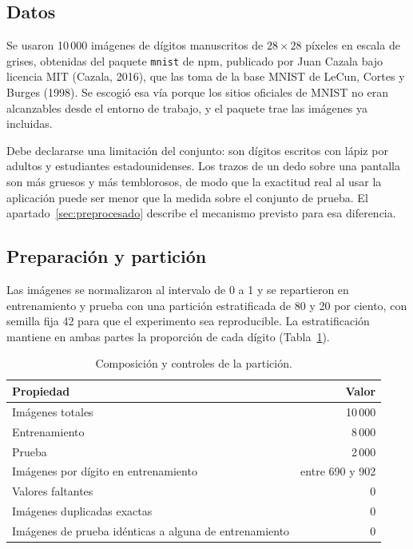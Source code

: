 \documentclass[12pt,letterpaper]{article}
\begin{document}
\subsection{Datos}
\label{sec:datos}

Se usaron 10\,000 imágenes de dígitos manuscritos de $28\times28$ píxeles en escala
de grises, obtenidas del paquete \texttt{mnist} de npm, publicado por Juan Cazala
bajo licencia MIT (Cazala, 2016), que las toma de la base MNIST de LeCun, Cortes y
Burges (1998). Se escogió esa vía porque los sitios oficiales de MNIST no eran
alcanzables desde el entorno de trabajo, y el paquete trae las imágenes ya
incluidas.

Debe declararse una limitación del conjunto: son dígitos escritos con lápiz por
adultos y estudiantes estadounidenses. Los trazos de un dedo sobre una pantalla son
más gruesos y más temblorosos, de modo que la exactitud real al usar la aplicación
puede ser menor que la medida sobre el conjunto de prueba. El
apartado~\ref{sec:preprocesado} describe el mecanismo previsto para esa diferencia.

\subsection{Preparación y partición}

Las imágenes se normalizaron al intervalo de 0 a 1 y se repartieron en entrenamiento
y prueba con una partición estratificada de 80 y 20 por ciento, con semilla fija 42
para que el experimento sea reproducible. La estratificación mantiene en ambas
partes la proporción de cada dígito (Tabla~\ref{tab:particion}).

\begin{table}[htbp]
\centering
\caption{Composición y controles de la partición.}
\label{tab:particion}
\begin{tabular}{lr}
\toprule
\textbf{Propiedad} & \textbf{Valor} \\
\midrule
Imágenes totales & 10\,000 \\
Entrenamiento & 8\,000 \\
Prueba & 2\,000 \\
Imágenes por dígito en entrenamiento & entre 690 y 902 \\
Valores faltantes & 0 \\
Imágenes duplicadas exactas & 0 \\
Imágenes de prueba idénticas a alguna de entrenamiento & 0 \\
\bottomrule
\end{tabular}
\end{table}
\end{document}

